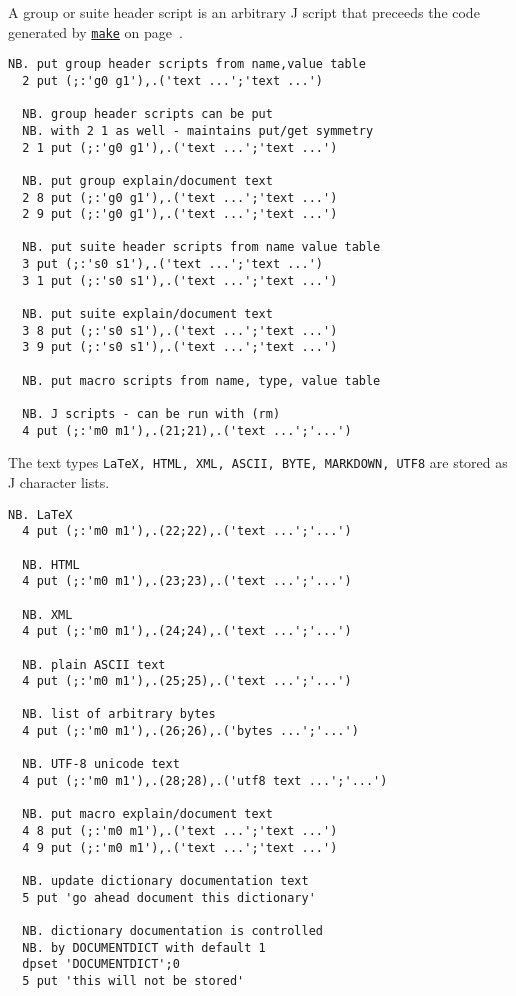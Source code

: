A group or suite header script is an arbitrary J script 
that preceeds the code generated by \hyperlink{il:make}{\texttt{make}} on page~\pageref{ss:make}.

\begin{lstlisting}[frame=single,framerule=0pt] 
  NB. put group header scripts from name,value table
  2 put (;:'g0 g1'),.('text ...';'text ...') 
  
  NB. group header scripts can be put 
  NB. with 2 1 as well - maintains put/get symmetry 
  2 1 put (;:'g0 g1'),.('text ...';'text ...') 

  NB. put group explain/document text
  2 8 put (;:'g0 g1'),.('text ...';'text ...')
  2 9 put (;:'g0 g1'),.('text ...';'text ...') 

  NB. put suite header scripts from name value table
  3 put (;:'s0 s1'),.('text ...';'text ...') 
  3 1 put (;:'s0 s1'),.('text ...';'text ...') 

  NB. put suite explain/document text
  3 8 put (;:'s0 s1'),.('text ...';'text ...')
  3 9 put (;:'s0 s1'),.('text ...';'text ...') 

  NB. put macro scripts from name, type, value table
  
  NB. J scripts - can be run with (rm)
  4 put (;:'m0 m1'),.(21;21),.('text ...';'...') 
\end{lstlisting}
 
The text types \texttt{LaTeX, HTML, XML, ASCII, BYTE, MARKDOWN, UTF8}
are stored as J character lists. 

\begin{lstlisting}[frame=single,framerule=0pt]   
  NB. LaTeX 
  4 put (;:'m0 m1'),.(22;22),.('text ...';'...') 
  
  NB. HTML 
  4 put (;:'m0 m1'),.(23;23),.('text ...';'...') 

  NB. XML 
  4 put (;:'m0 m1'),.(24;24),.('text ...';'...') 
  
  NB. plain ASCII text 
  4 put (;:'m0 m1'),.(25;25),.('text ...';'...') 
  
  NB. list of arbitrary bytes
  4 put (;:'m0 m1'),.(26;26),.('bytes ...';'...') 
  
  NB. UTF-8 unicode text 
  4 put (;:'m0 m1'),.(28;28),.('utf8 text ...';'...') 

  NB. put macro explain/document text
  4 8 put (;:'m0 m1'),.('text ...';'text ...')
  4 9 put (;:'m0 m1'),.('text ...';'text ...') 
  
  NB. update dictionary documentation text
  5 put 'go ahead document this dictionary'
  
  NB. dictionary documentation is controlled 
  NB. by DOCUMENTDICT with default 1
  dpset 'DOCUMENTDICT';0
  5 put 'this will not be stored' 
\end{lstlisting}
  

